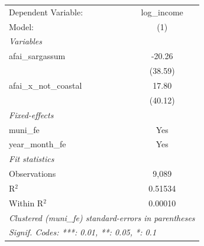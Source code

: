 \begingroup
\centering
\begin{tabular}{lc}
   \tabularnewline \midrule \midrule
   Dependent Variable:      & log\_income\\   
   Model:                   & (1)\\  
   \midrule
   \emph{Variables}\\
   afai\_sargassum          & -20.26\\   
                            & (38.59)\\   
   afai\_x\_not\_coastal    & 17.80\\   
                            & (40.12)\\   
   \midrule
   \emph{Fixed-effects}\\
   muni\_fe                 & Yes\\  
   year\_month\_fe          & Yes\\  
   \midrule
   \emph{Fit statistics}\\
   Observations             & 9,089\\  
   R$^2$                    & 0.51534\\  
   Within R$^2$             & 0.00010\\  
   \midrule \midrule
   \multicolumn{2}{l}{\emph{Clustered (muni\_fe) standard-errors in parentheses}}\\
   \multicolumn{2}{l}{\emph{Signif. Codes: ***: 0.01, **: 0.05, *: 0.1}}\\
\end{tabular}
\par\endgroup
